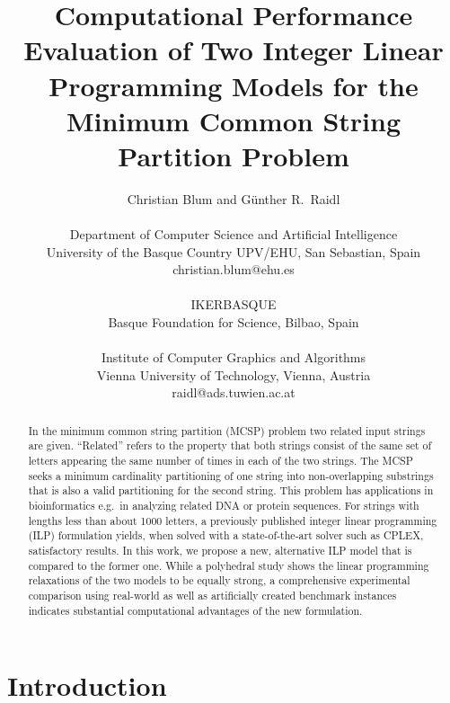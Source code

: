 \documentclass[11pt,a4paper]{article}
\begin{document}
\title{Computational Performance Evaluation of Two Integer Linear Programming Models for the Minimum Common String Partition Problem}

\author{Christian Blum and G{\"u}nther R.~Raidl  \\
~\\
Department of Computer Science and Artificial Intelligence\\ 
University of the Basque Country UPV/EHU, San Sebastian, Spain \\
{\sf christian.blum@ehu.es}\\
~\\
IKERBASQUE\\
Basque Foundation for Science, Bilbao, Spain\\
~\\
Institute of Computer Graphics and Algorithms\\
Vienna University of Technology, Vienna, Austria \\
{\sf raidl@ads.tuwien.ac.at}}

\date{}

\maketitle

\begin{abstract}
In the minimum common string partition (MCSP) problem two related input
strings are given. ``Related'' refers to the property that both strings
consist of the same set of letters appearing the same number
of times in each of the two strings. The MCSP seeks a minimum
cardinality partitioning of one string into non-overlapping substrings
that is also a valid partitioning for the second string. This problem
has applications in bioinformatics e.g.\ in analyzing related DNA or
protein sequences.
For strings with lengths less than about 1000 letters, a previously
published integer linear programming (ILP) formulation yields, 
when solved with a state-of-the-art solver such as CPLEX,  satisfactory results. 
In this work, we propose a new, alternative ILP model that is compared 
to the former one. While a polyhedral study shows the linear programming
relaxations of the two models to be equally strong, a comprehensive
experimental comparison using real-world as well as artificially
created benchmark instances indicates substantial computational advantages
of the new formulation.
\end{abstract}

\section{Introduction}
\label{intro}
\end{document}
